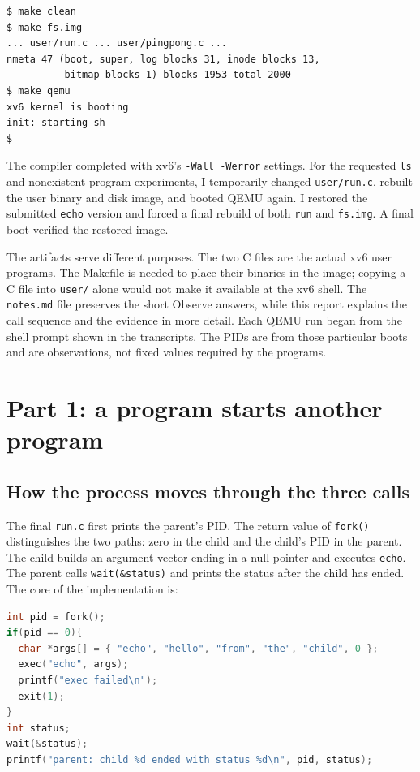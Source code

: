 \documentclass[12pt]{article}
\begin{document}
\begin{lstlisting}
$ make clean
$ make fs.img
... user/run.c ... user/pingpong.c ...
nmeta 47 (boot, super, log blocks 31, inode blocks 13,
          bitmap blocks 1) blocks 1953 total 2000
$ make qemu
xv6 kernel is booting
init: starting sh
$
\end{lstlisting}

The compiler completed with xv6's \texttt{-Wall -Werror} settings. For
the requested \texttt{ls} and nonexistent-program experiments, I
temporarily changed \texttt{user/run.c}, rebuilt the user binary and disk
image, and booted QEMU again. I restored the submitted \texttt{echo}
version and forced a final rebuild of both \texttt{run} and
\texttt{fs.img}. A final boot verified the restored image.

The artifacts serve different purposes. The two C files are the actual
xv6 user programs. The Makefile is needed to place their binaries in the
image; copying a C file into \texttt{user/} alone would not make it
available at the xv6 shell. The \texttt{notes.md} file preserves the
short Observe answers, while this report explains the call sequence and
the evidence in more detail. Each QEMU run began from the shell prompt
shown in the transcripts. The PIDs are from those particular boots and
are observations, not fixed values required by the programs.

\clearpage
\section{Part 1: a program starts another program}
\subsection{How the process moves through the three calls}
The final \texttt{run.c} first prints the parent's PID. The return value
of \texttt{fork()} distinguishes the two paths: zero in the child and
the child's PID in the parent. The child builds an argument vector ending
in a null pointer and executes \texttt{echo}. The parent calls
\texttt{wait(\&status)} and prints the status after the child has ended.
The core of the implementation is:

\begin{lstlisting}[language=C]
int pid = fork();
if(pid == 0){
  char *args[] = { "echo", "hello", "from", "the", "child", 0 };
  exec("echo", args);
  printf("exec failed\n");
  exit(1);
}
int status;
wait(&status);
printf("parent: child %d ended with status %d\n", pid, status);
\end{lstlisting}
\end{document}
